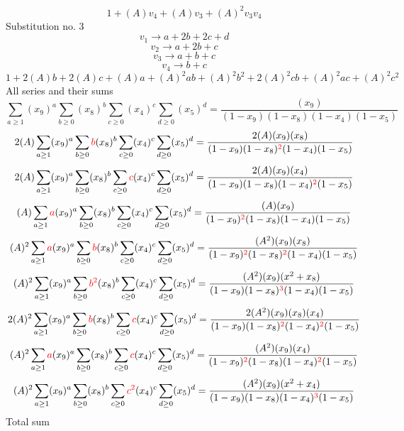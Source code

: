 \documentclass{article}
\begin{document}
\[1+(A)v_4+(A)v_3+(A)^2v_3v_4\]Substitution no. 3\[v_1\rightarrow{a+2b+2c+d}\]\[v_2\rightarrow{a+2b+c}\]\[v_3\rightarrow{a+b+c}\]\[v_4\rightarrow{b+c}\]\[1+2(A)b+2(A)c+(A)a+(A)^2ab+(A)^2b^{2}+2(A)^2cb+(A)^2ac+(A)^2c^{2}\]All series and their sums\[\sum_{a\geq{1}}(x_9)^{a}\sum_{b\geq{0}}(x_8)^{b}\sum_{c\geq{0}}(x_4)^{c}\sum_{d\geq{0}}(x_5)^{d}=\frac{(x_9)}{(1-x_9)(1-x_8)(1-x_4)(1-x_5)}\]\[2(A)\sum_{a\geq{1}}(x_9)^{a}\sum_{b\geq{0}}\textcolor{red}{b}(x_8)^{b}\sum_{c\geq{0}}(x_4)^{c}\sum_{d\geq{0}}(x_5)^{d}=\frac{2(A)(x_9)(x_8)}{(1-x_9)(1-x_8)^{\textcolor{red}{2}}(1-x_4)(1-x_5)}\]\[2(A)\sum_{a\geq{1}}(x_9)^{a}\sum_{b\geq{0}}(x_8)^{b}\sum_{c\geq{0}}\textcolor{red}{c}(x_4)^{c}\sum_{d\geq{0}}(x_5)^{d}=\frac{2(A)(x_9)(x_4)}{(1-x_9)(1-x_8)(1-x_4)^{\textcolor{red}{2}}(1-x_5)}\]\[(A)\sum_{a\geq{1}}\textcolor{red}{a}(x_9)^{a}\sum_{b\geq{0}}(x_8)^{b}\sum_{c\geq{0}}(x_4)^{c}\sum_{d\geq{0}}(x_5)^{d}=\frac{(A)(x_9)}{(1-x_9)^{\textcolor{red}{2}}(1-x_8)(1-x_4)(1-x_5)}\]\[(A)^{2}\sum_{a\geq{1}}\textcolor{red}{a}(x_9)^{a}\sum_{b\geq{0}}\textcolor{red}{b}(x_8)^{b}\sum_{c\geq{0}}(x_4)^{c}\sum_{d\geq{0}}(x_5)^{d}=\frac{(A^{2})(x_9)(x_8)}{(1-x_9)^{\textcolor{red}{2}}(1-x_8)^{\textcolor{red}{2}}(1-x_4)(1-x_5)}\]\[(A)^{2}\sum_{a\geq{1}}(x_9)^{a}\sum_{b\geq{0}}\textcolor{red}{b^{2}}(x_8)^{b}\sum_{c\geq{0}}(x_4)^{c}\sum_{d\geq{0}}(x_5)^{d}=\frac{(A^{2})(x_9)(x^{2}+x_8)}{(1-x_9)(1-x_8)^{\textcolor{red}{3}}(1-x_4)(1-x_5)}\]\[2(A)^{2}\sum_{a\geq{1}}(x_9)^{a}\sum_{b\geq{0}}\textcolor{red}{b}(x_8)^{b}\sum_{c\geq{0}}\textcolor{red}{c}(x_4)^{c}\sum_{d\geq{0}}(x_5)^{d}=\frac{2(A^{2})(x_9)(x_8)(x_4)}{(1-x_9)(1-x_8)^{\textcolor{red}{2}}(1-x_4)^{\textcolor{red}{2}}(1-x_5)}\]\[(A)^{2}\sum_{a\geq{1}}\textcolor{red}{a}(x_9)^{a}\sum_{b\geq{0}}(x_8)^{b}\sum_{c\geq{0}}\textcolor{red}{c}(x_4)^{c}\sum_{d\geq{0}}(x_5)^{d}=\frac{(A^{2})(x_9)(x_4)}{(1-x_9)^{\textcolor{red}{2}}(1-x_8)(1-x_4)^{\textcolor{red}{2}}(1-x_5)}\]\[(A)^{2}\sum_{a\geq{1}}(x_9)^{a}\sum_{b\geq{0}}(x_8)^{b}\sum_{c\geq{0}}\textcolor{red}{c^{2}}(x_4)^{c}\sum_{d\geq{0}}(x_5)^{d}=\frac{(A^{2})(x_9)(x^{2}+x_4)}{(1-x_9)(1-x_8)(1-x_4)^{\textcolor{red}{3}}(1-x_5)}\]
Total sum
\end{document}
